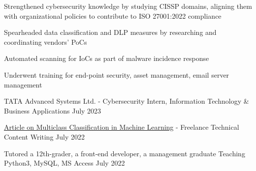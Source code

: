 
\begin{cventries}

  \cventry
    {
     \begin{cvitems} %
        \item{Strengthened cybersecurity knowledge by studying CISSP domains, aligning them with organizational policies to contribute to ISO 27001:2022 compliance}
        \item{Spearheaded data classification and DLP measures by researching and coordinating vendors' PoCs}
        \item{Automated scanning for IoCs as part of malware incidence response}
         \item{Underwent training for end-point security, asset management, email server management}
      \end{cvitems}
    } %
    {TATA Advanced Systems Ltd. - Cybersecurity Intern, Information Technology \& Business Applications} %
    {July 2023} %
    {} %
    {}

 \vspace{-4.0mm} 


  \cventry
    {} %
    {\href{https://copyassignment.com/multiclass-classification-in-machine-learning/}{Article on Multiclass Classification in Machine Learning} - Freelance Technical Content Writing} %
    {July 2022} %
    {} %
    { 
    }

 \vspace{-8.5mm} 
 
  \cventry
{Tutored a 12th-grader, a front-end developer, a management graduate} %
{Teaching Python3, MySQL, MS Access} %
{July 2022} %
{} %
{ 
}


 
 \vspace{-6.5mm} 

\end{cventries}
